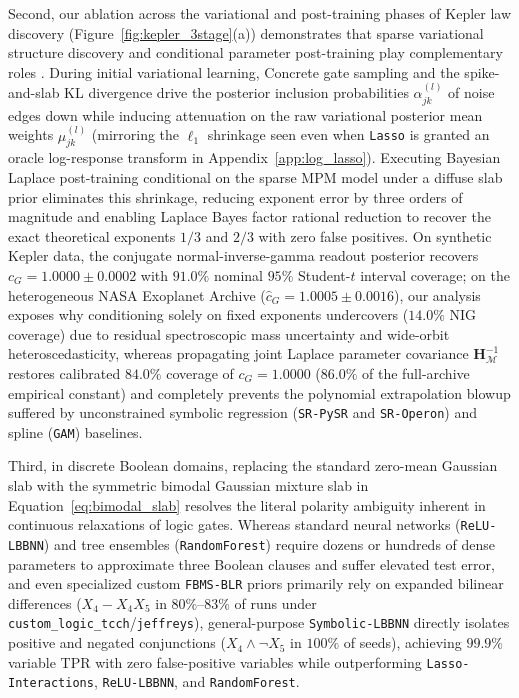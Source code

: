 \documentclass[11pt,a4paper]{article}
\begin{document}
Second, our ablation across the variational and post-training phases of Kepler law discovery (Figure~\ref{fig:kepler_3stage}(a)) demonstrates that sparse variational structure discovery and conditional parameter post-training play complementary roles \citep{hubin2024sparse}. During initial variational learning, Concrete gate sampling and the spike-and-slab KL divergence drive the posterior inclusion probabilities $\alpha_{jk}^{(l)}$ of noise edges down while inducing attenuation on the raw variational posterior mean weights $\mu_{jk}^{(l)}$ (mirroring the $\ell_1$ shrinkage seen even when \texttt{Lasso} is granted an oracle log-response transform in Appendix~\ref{app:log_lasso}). Executing Bayesian Laplace post-training conditional on the sparse MPM model under a diffuse slab prior eliminates this shrinkage, reducing exponent error by three orders of magnitude and enabling Laplace Bayes factor rational reduction to recover the exact theoretical exponents $1/3$ and $2/3$ with zero false positives. On synthetic Kepler data, the conjugate normal-inverse-gamma readout posterior recovers $c_G = 1.0000 \pm 0.0002$ with $91.0\%$ nominal $95\%$ Student-$t$ interval coverage; on the heterogeneous NASA Exoplanet Archive ($\hat{c}_G = 1.0005 \pm 0.0016$), our analysis exposes why conditioning solely on fixed exponents undercovers ($14.0\%$ NIG coverage) due to residual spectroscopic mass uncertainty and wide-orbit heteroscedasticity, whereas propagating joint Laplace parameter covariance $\bm{H}_{\mathcal{M}}^{-1}$ restores calibrated $84.0\%$ coverage of $c_G = 1.0000$ ($86.0\%$ of the full-archive empirical constant) and completely prevents the polynomial extrapolation blowup suffered by unconstrained symbolic regression (\texttt{SR-PySR} and \texttt{SR-Operon}) and spline (\texttt{GAM}) baselines.

Third, in discrete Boolean domains, replacing the standard zero-mean Gaussian slab with the symmetric bimodal Gaussian mixture slab in Equation~\eqref{eq:bimodal_slab} resolves the literal polarity ambiguity inherent in continuous relaxations of logic gates. Whereas standard neural networks (\texttt{ReLU-LBBNN}) and tree ensembles (\texttt{RandomForest}) require dozens or hundreds of dense parameters to approximate three Boolean clauses and suffer elevated test error, and even specialized custom \texttt{FBMS-BLR} priors primarily rely on expanded bilinear differences ($X_4 - X_4 X_5$ in $80\%\text{--}83\%$ of runs under \texttt{custom\_logic\_tcch}/\texttt{jeffreys}), general-purpose \texttt{Symbolic-LBBNN} directly isolates positive and negated conjunctions ($X_4 \land \neg X_5$ in $100\%$ of seeds), achieving $99.9\%$ variable TPR with zero false-positive variables while outperforming \texttt{Lasso-Interactions}, \texttt{ReLU-LBBNN}, and \texttt{RandomForest}.
\end{document}

